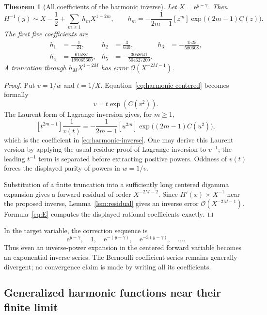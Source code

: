 \documentclass[11pt,a4paper]{article}
\numberwithin{equation}{section}
\newtheorem{theorem}{Theorem}[section]
\theoremstyle{definition}
\theoremstyle{remark}
\newcommand{\ee}{\mathrm e}
\newcommand{\bigO}{\mathcal O}
\begin{document}
\begin{theorem}[All coefficients of the harmonic inverse]
\label{thm:harmonic-inverse}
Let $X=\ee^{y-\gamma}$. Then
\begin{equation}
 H^{-1}(y)\sim X-\frac12+\sum_{m\ge1}h_mX^{1-2m},
 \qquad
 h_m=-\frac1{2m-1}[z^m]\exp\bigl((2m-1)C(z)\bigr).
 \label{eq:harmonic-inverse}
\end{equation}
The first five coefficients are
\begin{align}
 h_1&=-\frac1{24},&h_2&=\frac3{640},&
 h_3&=-\frac{1525}{580608},\nonumber\\
 h_4&=\frac{615881}{199065600},&
 h_5&=-\frac{3058641}{504627200}.
 \label{eq:harmonic-coeff}
\end{align}
A truncation through $h_MX^{1-2M}$ has error $\bigO(X^{-2M-1})$.
\end{theorem}
\begin{proof}
Put $v=1/w$ and $t=1/X$. Equation~\eqref{eq:harmonic-centered} becomes formally
\[
 v=t\exp(C(v^2)).
\]
The Laurent form of Lagrange inversion gives, for $m\ge1$,
\[
 [t^{2m-1}]\frac1{v(t)}
 =-\frac1{2m-1}[u^{2m}]
             \exp\bigl((2m-1)C(u^2)\bigr),
\]
which is the coefficient in \eqref{eq:harmonic-inverse}. One may derive this Laurent version by applying the usual residue proof of Lagrange inversion to $v^{-1}$; the leading $t^{-1}$ term is separated before extracting positive powers. Oddness of $v(t)$ forces the displayed parity of powers in $w=1/v$.

Substitution of a finite truncation into a sufficiently long centered digamma expansion gives a forward residual of order $X^{-2M-2}$. Since $H'(x)\asymp X^{-1}$ near the proposed inverse, Lemma~\ref{lem:residual} gives an inverse error $\bigO(X^{-2M-1})$. Formula~\eqref{eq:E} computes the displayed rational coefficients exactly.
\end{proof}

In the target variable, the correction sequence is
\[
 \ee^{y-\gamma},\quad 1,\quad
 \ee^{-(y-\gamma)},\quad\ee^{-3(y-\gamma)},\quad\ldots.
\]
Thus even an inverse-power expansion in the centered forward variable becomes an exponential inverse series. The Bernoulli coefficient series remains generally divergent; no convergence claim is made by writing all its coefficients.

\subsection{Generalized harmonic functions near their finite limit}
\end{document}
